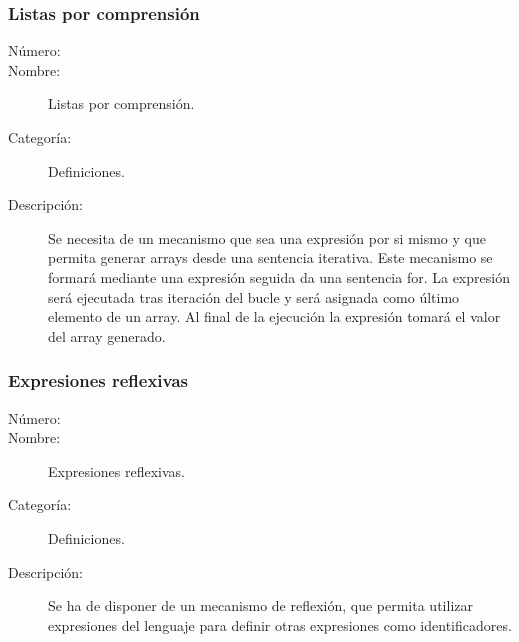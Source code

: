 \subsubsection{Listas por comprensión}
	\begin{description}
		\item [Número:] \cn
		\item [Nombre:] Listas por comprensión.
		\item [Categoría:] Definiciones.
		\item [Descripción:] Se necesita de un mecanismo que sea una expresión por si mismo y que permita generar arrays desde una sentencia iterativa. 
		Este mecanismo se formará mediante una expresión seguida da una sentencia for. La expresión será ejecutada tras iteración del bucle y será 
		asignada como último elemento de un array. Al final de la ejecución la expresión tomará el valor del array generado.
	\end{description}


\subsubsection{Expresiones reflexivas}
	\begin{description}
		\item [Número:] \cn
		\item [Nombre:] Expresiones reflexivas.
		\item [Categoría:] Definiciones.
		\item [Descripción:] Se ha de disponer de un mecanismo de reflexión, que permita
utilizar expresiones del lenguaje para definir otras expresiones como identificadores.
	\end{description}
